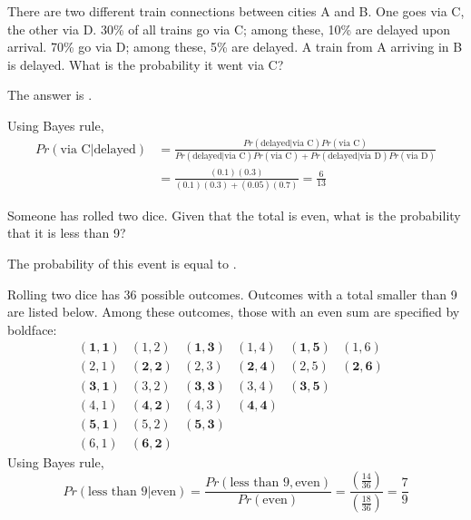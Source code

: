 \begin{question}
There are two different train connections between cities A and B.  One goes via C, the other via D.  30\% of all trains go via C; among these, 10\% are delayed upon arrival.  70\% go via D; among these, 5\% are delayed.   A train from A arriving in B is delayed.  What is the probability it went via C?
\begin{solution}
The answer is .
\end{solution}
Using Bayes rule,
\begin{align*}
Pr (\text{via C} | \text{delayed}) &= \frac{Pr(\text{delayed} | \text{via C}) Pr(\text{via C})}{Pr(\text{delayed} | \text{via C}) Pr(\text{via C}) + Pr(\text{delayed} | \text{via D}) Pr(\text{via D})} \\
& = \frac{(0.1)(0.3)}{(0.1)(0.3) + (0.05)(0.7)} = \frac{6}{13}
\end{align*}
\end{question}

\begin{question}
Someone has rolled two dice.  Given that the total is even, what is the probability that it is less than 9?
\begin{solution}
The probability of this event is equal to .
\end{solution}
Rolling two dice has 36 possible outcomes. Outcomes with a total smaller than 9 are listed below. Among these outcomes, those with an even sum are specified by boldface:
\begin{equation*}
\begin{matrix}
\mathbf{(1,1)} & (1,2) & \mathbf{(1,3)} & (1,4) & \mathbf{(1,5)} & (1,6) \\
(2,1) & \mathbf{(2,2)} & (2,3) & \mathbf{(2,4)} & (2,5) & \mathbf{(2,6)} \\
\mathbf{(3,1)} & (3,2) & \mathbf{(3,3)} & (3,4) & \mathbf{(3,5)} && \\
(4,1) & \mathbf{(4,2)} & (4,3) & \mathbf{(4,4)} &&& \\
\mathbf{(5,1)} & (5,2) & \mathbf{(5,3)} &&&& \\
(6,1) & \mathbf{(6,2)}
\end{matrix}
\end{equation*}
Using Bayes rule,
\begin{equation*}
Pr (\text{less than 9} | \text{even}) = \frac{Pr(\text{less than 9}, \text{even})}{Pr(\text{even})} = \frac{(\frac{14}{36})}{(\frac{18}{36})} = \frac{7}{9}
\end{equation*}
\end{question}

